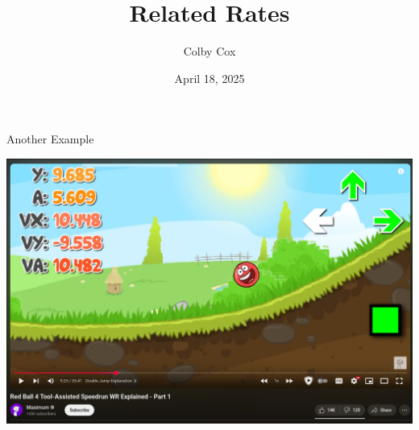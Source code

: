 \documentclass[aspectratio=169,xcolor=dvipsnames]{beamer}
\title{Related Rates}
\author{Colby Cox}
\institute
{
    University of Central Arkansas %
}
\date{April 18, 2025} %
\begin{document}
\begin{frame}
  \titlepage
\end{frame}

\begin{frame}{Another Example}
  \begin{center}
    \includegraphics[scale=0.2]{redBall.png}
  \end{center}
\end{frame}
\end{document}
